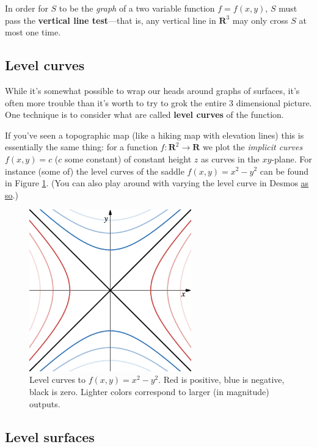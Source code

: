 \documentclass[12pt]{article}
\numberwithin{equation}{subsection}
\numberwithin{figure}{subsection}
\theoremstyle{note}
\begin{document}
{In order for $S$ to be the \textit{graph} of a two variable function $f=f(x,y)$, $S$ must pass the \textbf{vertical line test}---that is, any vertical line in $\mathbf{R}^3$ may only cross $S$ at most one time.

\subsection{Level curves}
While it's somewhat possible to wrap our heads around graphs of surfaces, it's often more trouble than it's worth to try to grok the entire 3 dimensional picture. One technique is to consider what are called  \textbf{level curves} of the function. 

If you've seen a topographic map (like a hiking map with elevation lines) this is essentially the same thing: for a function $f\colon \mathbf{R}^2 \to \mathbf{R}$ we plot the \textit{implicit curves} $f(x,y)=c$ ($c$ some constant) of constant height $z$ as curves in the $xy$-plane. For instance (some of) the level curves of the saddle $f(x,y)=x^2-y^2$ can be found in Figure \ref{fig-level-curves}. (You can also play around with varying the level curve in Desmos \href{https://www.desmos.com/calculator/tazoydam1p}{as so}.)

\begin{figure}[h!]
\centering 
\includegraphics[height=70mm]{Images/levelcurves-saddle} 
\caption{Level curves to $f(x,y)=x^2-y^2$. Red is positive, blue is negative, black is zero. Lighter colors correspond to larger (in magnitude) outputs.}
\label{fig-level-curves}
\end{figure}



\subsection{Level surfaces}

}
\end{document}

